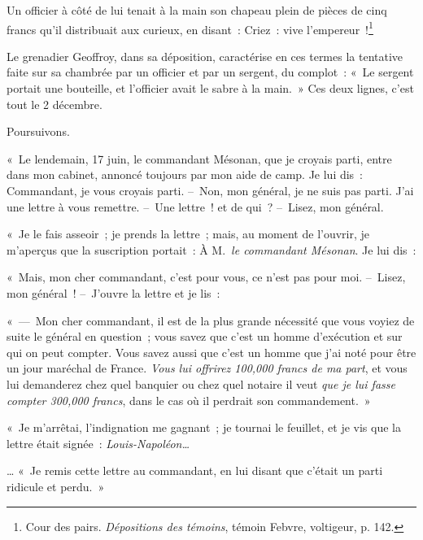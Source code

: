 \documentclass[french,twoside]{book} %
\newenvironment{quoteblock}%
  {\begin{quoting}}
  {\end{quoting}}
\newenvironment{quotebar}{%
    \def\FrameCommand{{\color{rubric!10!}\vrule width 0.5em} \hspace{0.9em}}%
    \def\OuterFrameSep{0pt} %
    \MakeFramed {\advance\hsize-\width \FrameRestore}
  }%
  {%
    \endMakeFramed
  }
\renewenvironment{quoteblock}%
  {%
    \savenotes
    \setstretch{0.9}
    \begin{quotebar}
    \smallskip
  }
  {%
    \smallskip
    \end{quotebar}
    \spewnotes
  }
\begin{document}
Un officier à côté de lui tenait à la main son chapeau plein de pièces de cinq francs qu’il distribuait aux curieux, en disant : Criez : vive l’empereur !\footnote{Cour des pairs. \emph{Dépositions des témoins}, témoin Febvre, voltigeur, p. 142.}\par
Le grenadier Geoffroy, dans sa déposition, caractérise en ces termes la tentative faite sur sa chambrée par un officier et par un sergent, du complot : « Le sergent portait une bouteille, et l’officier avait le sabre à la main. » Ces deux lignes, c’est tout le 2 décembre.\par
Poursuivons.\par

\begin{quoteblock}
 \noindent « Le lendemain, 17 juin, le commandant Mésonan, que je croyais parti, entre dans mon cabinet, annoncé toujours par mon aide de camp. Je lui dis : Commandant, je vous croyais parti. – Non, mon général, je ne suis pas parti. J’ai une lettre à vous remettre. – Une lettre ! et de qui ? – Lisez, mon général.\par
 « Je le fais asseoir ; je prends la lettre ; mais, au moment de l’ouvrir, je m’aperçus que la suscription portait : À M. \emph{le commandant Mésonan}. Je lui dis :\par
 « Mais, mon cher commandant, c’est pour vous, ce n’est pas pour moi. – Lisez, mon général ! – J’ouvre la lettre et je lis :\par
 « — Mon cher commandant, il est de la plus grande nécessité que vous voyiez de suite le général en question ; vous savez que c’est un homme d’exécution et sur qui on peut compter. Vous savez aussi que c’est un homme que j’ai noté pour être un jour maréchal de France. \emph{Vous lui offrirez 100,000 francs de ma part}, et vous lui demanderez chez quel banquier ou chez quel notaire il veut \emph{que je lui fasse compter 300,000 francs}, dans le cas où il perdrait son commandement. »\par
 « Je m’arrêtai, l’indignation me gagnant ; je tournai le feuillet, et je vis que la lettre était signée : \emph{Louis-Napoléon…}\par
 … « Je remis cette lettre au commandant, en lui disant que c’était un parti ridicule et perdu. »
 \end{quoteblock}
\end{document}
